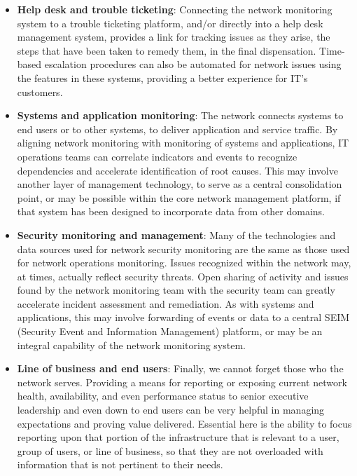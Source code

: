\documentclass[8pt]{extarticle}
\begin{document}
\begin{multicols}{3}
\begin{itemize}
    \item \textbf{Help desk and trouble ticketing}: Connecting the network monitoring system to a trouble ticketing
    platform, and/or directly into a help desk management system, provides a link for tracking issues
    as they arise, the steps that have been taken to remedy them, in the final dispensation. Time-based
    escalation procedures can also be automated for network issues using the features in these systems,
    providing a better experience for IT’s customers.
    \item \textbf{Systems and application monitoring}: The network connects systems to end users or to other systems,
    to deliver application and service traffic. By aligning network monitoring with monitoring of systems
    and applications, IT operations teams can correlate indicators and events to recognize dependencies
    and accelerate identification of root causes. This may involve another layer of management technology,
    to serve as a central consolidation point, or may be possible within the core network management
    platform, if that system has been designed to incorporate data from other domains.
    \item \textbf{Security monitoring and management}: Many of the technologies and data sources used for
    network security monitoring are the same as those used for network operations monitoring. Issues
    recognized within the network may, at times, actually reflect security threats. Open sharing of
    activity and issues found by the network monitoring team with the security team can greatly
    accelerate incident assessment and remediation. As with systems and applications, this may involve
    forwarding of events or data to a central SEIM (Security Event and Information Management)
    platform, or may be an integral capability of the network monitoring system.
    \item \textbf{Line of business and end users}: Finally, we cannot forget those who the network serves. Providing
    a means for reporting or exposing current network health, availability, and even performance
    status to senior executive leadership and even down to end users can be very helpful in managing
    expectations and proving value delivered. Essential here is the ability to focus reporting upon that
    portion of the infrastructure that is relevant to a user, group of users, or line of business, so that
    they are not overloaded with information that is not pertinent to their needs.
\end{itemize}


\end{multicols}
\end{document}
